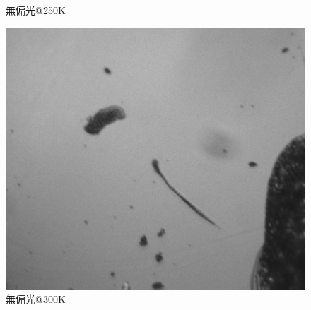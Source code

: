 \documentclass[11pt,a4paper]{jsarticle}
\begin{document}
\begin{figure}[htb]
\begin{minipage}{0.333\hsize}
\begin{center}
  \end{center}
  \caption{無偏光@250K}
  \label{fig:nonpol250_2}
 \end{minipage}
 \begin{minipage}{0.333\hsize}
  \begin{center}
   \includegraphics[width=\hsize]{nonpol300_2.eps}
  \end{center}
  \caption{無偏光@300K}
  \label{fig:nonpol300_2}
 \end{minipage}
\end{figure}
\end{document}
